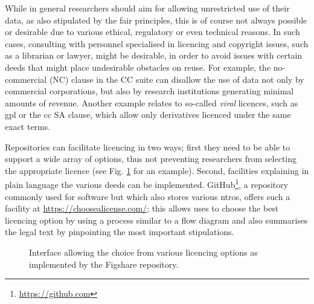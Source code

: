 While in general researchers should aim for allowing unrestricted use of their data, as also stipulated by the \gls{fair} principles, this is of course not always possible or desirable due to various ethical, regulatory or even technical reasons. In such cases, consulting with personnel specialised in licencing and copyright issues, such as a librarian or lawyer, might be desirable, in order to avoid issues with certain deeds that might place undesirable obstacles on reuse. For example, the no-commercial (NC) clause in the CC suite can disallow the use of data not only by commercial corporations, but also by research institutions generating minimal amounts of revenue\cite{ccbyncndrisks}. Another example relates to so-called \emph{viral} licences, such as \gls{gpl} or the \gls{cc} SA clause, which allow only derivatives licenced under the same exact terms.

Repositories can facilitate licencing in two ways; first they need to be able to support a wide array of options, thus not preventing researchers from selecting the appropriate licence (see Fig. \ref{fig:lic} for an example). Second, facilities explaining in plain language the various deeds can be implemented. GitHub\footnote{\url{https://github.com}}, a repository commonly used for software but which also stores various \glspl{ntro}, offers such a facility at \url{https://choosealicense.com/}; this allows uses to choose the best licencing option by using a process similar to a flow diagram and also summarises the legal text by pinpointing the most important stipulations.

\begin{figure}[ht!]
\centering
  \caption{Interface allowing the choice from various licencing options as implemented by the Figshare repository.}
  \label{fig:lic}
\end{figure}

